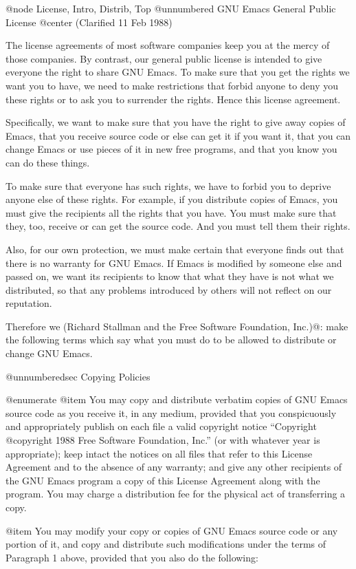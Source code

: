 @node License, Intro, Distrib, Top
@unnumbered GNU Emacs General Public License
@center (Clarified 11 Feb 1988)

  The license agreements of most software companies keep you at the
mercy of those companies.  By contrast, our general public license is
intended to give everyone the right to share GNU Emacs.  To make
sure that you get the rights we want you to have, we need to make
restrictions that forbid anyone to deny you these rights or to ask you
to surrender the rights.  Hence this license agreement.

  Specifically, we want to make sure that you have the right to give
away copies of Emacs, that you receive source code or else can get it
if you want it, that you can change Emacs or use pieces of it in new
free programs, and that you know you can do these things.

  To make sure that everyone has such rights, we have to forbid you to
deprive anyone else of these rights.  For example, if you distribute
copies of Emacs, you must give the recipients all the rights that you
have.  You must make sure that they, too, receive or can get the
source code.  And you must tell them their rights.

  Also, for our own protection, we must make certain that everyone
finds out that there is no warranty for GNU Emacs.  If Emacs is
modified by someone else and passed on, we want its recipients to know
that what they have is not what we distributed, so that any problems
introduced by others will not reflect on our reputation.

  Therefore we (Richard Stallman and the Free Software Foundation, Inc.)@:
make the following terms which say what you must do to be allowed to
distribute or change GNU Emacs.

@unnumberedsec Copying Policies

@enumerate
@item
You may copy and distribute verbatim copies of GNU Emacs source code as you
receive it, in any medium, provided that you conspicuously and
appropriately publish on each file a valid copyright notice ``Copyright
@copyright{} 1988 Free Software Foundation, Inc.'' (or with whatever year
is appropriate); keep intact the notices on all files that
refer to this License Agreement and to the absence of any warranty; and
give any other recipients of the GNU Emacs program a copy of this License
Agreement along with the program.  You may charge a distribution fee
for the physical act of transferring a copy.

@item
You may modify your copy or copies of GNU Emacs source code or
any portion of it, and copy and distribute such modifications under
the terms of Paragraph 1 above, provided that you also do the following:

